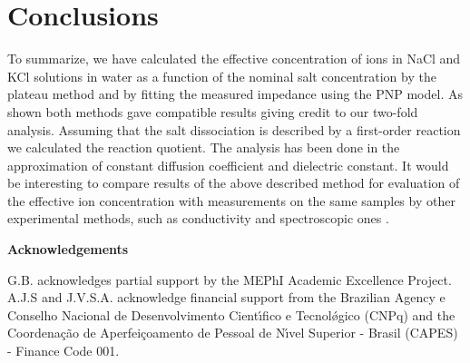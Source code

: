 \documentclass[preprint,aps,pre]{revtex4}
\begin{document}

\section{Conclusions}
\label{sec:4}

To summarize, we have calculated the effective concentration of ions in NaCl and KCl solutions in water as a function of the nominal salt concentration by the plateau method and by fitting the measured impedance using the PNP model. As shown both methods gave compatible results giving credit to our two-fold analysis. Assuming that the salt dissociation is described by a first-order reaction we calculated the reaction quotient. The analysis has been done in the approximation of constant diffusion coefficient and dielectric constant. It would be interesting to compare results of the above described method for evaluation of the effective ion concentration with measurements on the same samples by other experimental methods, such as conductivity \cite{bockris} and spectroscopic ones \cite{spectro1,spectro2,rev1,ftir}.



{\bf Acknowledgements}

G.B. acknowledges partial support by the MEPhI Academic
Excellence Project.
A.J.S and J.V.S.A. acknowledge financial support from the Brazilian Agency e Conselho Nacional de Desenvolvimento Cient\'{\i}fico e Tecnol\'{\o}gico (CNPq) and the Coordena\c{c}\~{a}o de Aperfei\c{c}oamento de Pessoal de N\'{\i}vel Superior - Brasil (CAPES) - Finance Code 001.
\end{document}
